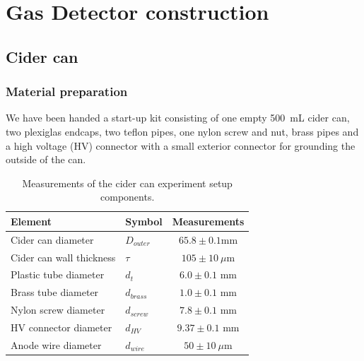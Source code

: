 \section{Gas Detector construction}
\label{sec:construction}

\subsection{Cider can}
\subsubsection{Material preparation}
We have been handed a start-up kit consisting of one empty \SI{500}{\milli\liter}
cider can, two plexiglas endcaps, two teflon pipes, one nylon screw and nut,
brass pipes and a high voltage (HV) connector with a small exterior connector for
grounding the outside of the can.

\begin{table}[H]
  \begin{tabularx}{\linewidth}{p{4cm}|p{3cm}|c}
    \textbf{Element}                  &\textbf{Symbol}  & \textbf{Measurements}  \\ \hline
    Cider can diameter         & $D_{outer}$              & $65.8 \pm 0.1 $mm     \\
    Cider can wall thickness   & $\tau$                 & $105 \pm 10 \ \mu$m    \\
    Plastic tube diameter      & $d_{t}$                 & $6.0\pm 0.1$ mm        \\
    Brass tube diameter        & $d_{brass}$              & $1.0\pm 0.1$ mm        \\
    Nylon screw diameter       & $d_{screw}$              & $7.8\pm 0.1$ mm         \\
    HV connector diameter      & $d_{HV}$                & $9.37\pm 0.1$ mm         \\
    Anode wire diameter        & $d_{wire}$               & $50 \pm 10 \ \mu$m      \\
    \hline
  \end{tabularx}
  \caption{Measurements of the cider can experiment setup components.}
  \label{Tab:cidercan_sizes}
\end{table}

